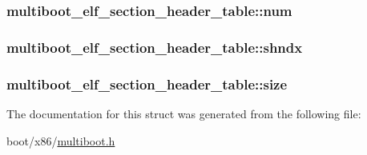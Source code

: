 \subsubsection[{num}]{ multiboot\+\_\+elf\+\_\+section\+\_\+header\+\_\+table\+::num}\label{structmultiboot__elf__section__header__table_ac7a3ee82a45af6c3c10413de7620eec2}
\hypertarget{structmultiboot__elf__section__header__table_adfc74c974ba232064320ba57a02d0fb3}{}
\subsubsection[{shndx}]{ multiboot\+\_\+elf\+\_\+section\+\_\+header\+\_\+table\+::shndx}\label{structmultiboot__elf__section__header__table_adfc74c974ba232064320ba57a02d0fb3}
\hypertarget{structmultiboot__elf__section__header__table_a87bed62f532b2e2e73ab41df40069e2a}{}
\subsubsection[{size}]{ multiboot\+\_\+elf\+\_\+section\+\_\+header\+\_\+table\+::size}\label{structmultiboot__elf__section__header__table_a87bed62f532b2e2e73ab41df40069e2a}


The documentation for this struct was generated from the following file\+:\begin{DoxyCompactItemize}
\item 
boot/x86/\hyperlink{multiboot_8h}{multiboot.\+h}\end{DoxyCompactItemize}
